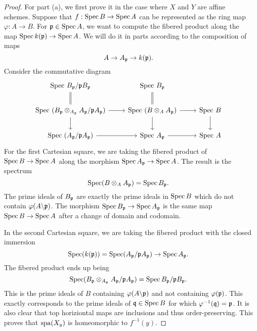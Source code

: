 \documentclass[]{pcmi}
\theoremstyle{plain}
\theoremstyle{definition}
\theoremstyle{remark}
\begin{document}
\begin{proof}
    For part (a), we first prove it in the case where $X$ and $Y$ are affine schemes. Suppose that $f : \operatorname{Spec} B \to \operatorname{Spec} A$ can be represented as the ring map $\varphi : A \to B$. For $\mathfrak{p} \in \operatorname{Spec} A$, we want to compute the fibered product along the map $\operatorname{Spec} k(\mathfrak{p}) \to \operatorname{Spec} A$. We will do it in parts according to the composition of maps 
    \[
        A \to A_{\mathfrak{p}} \to k(\mathfrak{p}). 
    \]
    Consider the commutative diagram 
    \[
        \begin{tikzcd}
            {\text{Spec } B_\mathfrak{p} / \mathfrak{p}B_\mathfrak{p}} & {\text{Spec } B_\mathfrak{p}} \\
            {\text{Spec } (B_{\mathfrak{p}} \otimes_{A_\mathfrak{p}} A_\mathfrak{p} / \mathfrak{p} A_\mathfrak{p})} & {\text{Spec } (B \otimes_A A_\mathfrak{p})} & {\text{Spec } B} \\
            {\text{Spec } (A_\mathfrak{p} / \mathfrak{p} A_\mathfrak{p})} & {\text{Spec } A_\mathfrak{p}} & {\text{Spec } A}
            \arrow[Rightarrow, no head, from=1-1, to=2-1]
            \arrow[from=2-1, to=2-2]
            \arrow[from=2-1, to=3-1]
            \arrow[Rightarrow, no head, from=2-2, to=1-2]
            \arrow[from=2-2, to=2-3]
            \arrow[from=2-2, to=3-2]
            \arrow[from=2-3, to=3-3]
            \arrow[from=3-1, to=3-2]
            \arrow[from=3-2, to=3-3]
        \end{tikzcd}
    \]
    For the first Cartesian square, we are taking the fibered product of $\operatorname{Spec} B \to \operatorname{Spec} A$ along the morphism $\operatorname{Spec} A_\mathfrak{p} \to \operatorname{Spec} A$. The result is the spectrum 
    \[
        \operatorname{Spec} (B \otimes_A A_\mathfrak{p}) = \operatorname{Spec} B_{\mathfrak{p}}. 
    \]
    The prime ideals of $B_{\mathfrak{p}}$ are exactly the prime ideals in $\operatorname{Spec} B$ which do not contain $\varphi(A \backslash \mathfrak{p})$. The morphism $\operatorname{Spec} B_{\mathfrak{p}} \to \operatorname{Spec} A_{\mathfrak{p}}$ is the same map $\operatorname{Spec} B \to \operatorname{Spec} A$ after a change of domain and codomain. 
    
    In the second Cartesian square, we are taking the fibered product with the closed immersion 
    \[
        \operatorname{Spec} (k(\mathfrak{p})) = \operatorname{Spec} (A_{\mathfrak{p}} / \mathfrak{p} A_{\mathfrak{p}}) \to \operatorname{Spec} A_{\mathfrak{p}}.
    \]
    The fibered product ends up being 
    \[
        \operatorname{Spec} (B_{\mathfrak{p}} \otimes_{A_{\mathfrak{p}}} A_{\mathfrak{p}} / \mathfrak{p} A_{\mathfrak{p}}) = \operatorname{Spec} B_{\mathfrak{p}} / \mathfrak{p} B_{\mathfrak{p}}. 
    \]
    This is the prime ideals of $B$ containing $\varphi(A \backslash \mathfrak{p})$ and not containing $\varphi(\mathfrak{p})$. This exactly corresponds to the prime ideals of $\mathfrak{q} \in \operatorname{Spec} B$ for which $\varphi^{-1}(\mathfrak{q}) = \mathfrak{p}$. It is also clear that top horiziontal maps are inclusions and thus order-preserving. This proves that $\operatorname{spa} (X_y)$ is homeomorphic to $f^{-1}(y)$. 
\end{proof}
\end{document}
